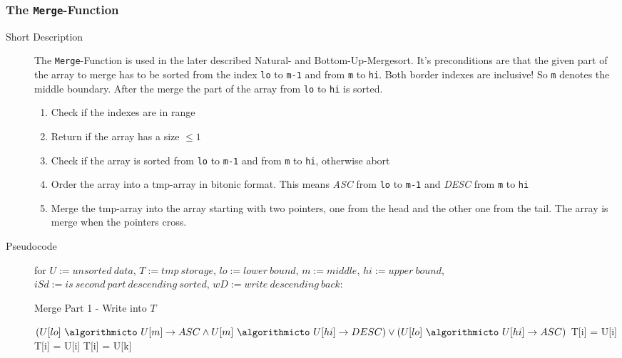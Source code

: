 \documentclass[11pt]{amsart}
\begin{document}
\subsubsection{The \texttt{Merge}-Function}
\begin{description}
	\item[Short Description] The \texttt{Merge}-Function is used in the later described Natural- and Bottom-Up-Mergesort. It's preconditions are that the given part of the array to merge has to be sorted from the index \texttt{lo} to \texttt{m-1} and from \texttt{m} to \texttt{hi}. Both border indexes are inclusive! So \texttt{m} denotes the middle boundary. After the merge the part of the array from \texttt{lo} to \texttt{hi} is sorted.
		\begin{enumerate}
			\item Check if the indexes are in range
			\item Return if the array has a size $\leq 1$
			\item Check if the array is sorted from \texttt{lo} to \texttt{m-1} and from \texttt{m} to \texttt{hi}, otherwise abort
			\item Order the array into a tmp-array in bitonic format. This means \textit{ASC} from \texttt{lo} to \texttt{m-1} and \textit{DESC} from \texttt{m} to \texttt{hi}
			\item Merge the tmp-array into the array starting with two pointers, one from the head and the other one from the tail. The array is merge when the pointers cross.
		\end{enumerate}
	\newpage
	\item[Pseudocode] for $U := unsorted~data$, $T := tmp~storage$, $lo := lower~bound$, $m := middle$, $hi :=upper~bound$, $iSd := is~second~part~descending~sorted$, $wD := write~descending~back$:
	\begin{algorithm}
	\caption{Merge Part 1 - Write into $T$}
		\begin{algorithmic}[1]
		\Require $(U[lo]~\algorithmicto~U[m] \to ASC \land U[m]~\algorithmicto~U[hi] \to DESC) \lor (U[lo]~\algorithmicto~U[hi] \to ASC)$
				 \State T[i] = U[i] \EndFor
			\Else{}
				 \State T[i] = U[i] \EndFor
				 \State T[i] = U[k] \EndFor
			\EndIf
		\end{algorithmic}

\end{algorithm}
\end{description}
\end{document}
